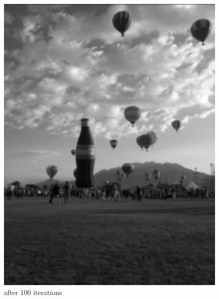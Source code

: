 \begin{figure}[ht]
\begin{minipage}[b]{0.45\linewidth}
\includegraphics[width=\textwidth]{baloon100}
\caption*{after 100 iterations}
\end{minipage}
\hspace{0.5cm}
\begin{minipage}[b]{0.45\linewidth}
\centering

\end{minipage}
\end{figure}
